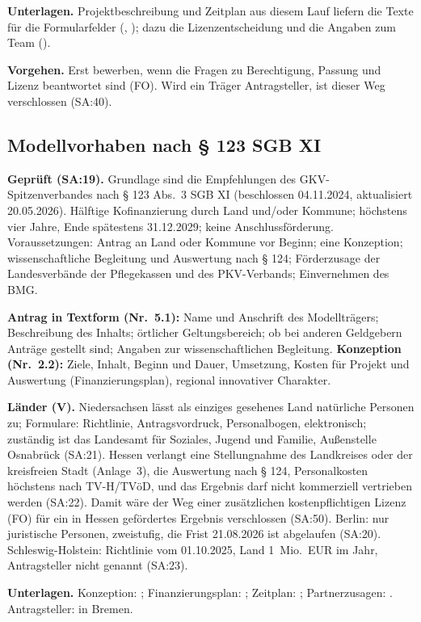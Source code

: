 \documentclass[10pt,parskip=half-]{scrartcl}
\begin{document}
\textbf{Unterlagen.} Projektbeschreibung und Zeitplan aus diesem Lauf liefern die Texte für die
Formularfelder (, ); dazu
die Lizenzentscheidung und die Angaben zum Team ().

\textbf{Vorgehen.} Erst bewerben, wenn die Fragen zu Berechtigung, Passung und Lizenz beantwortet
sind (FO). Wird ein Träger Antragsteller, ist dieser Weg verschlossen (SA:40).

\subsection{Modellvorhaben nach § 123 SGB XI}
\textbf{Geprüft (SA:19).} Grundlage sind die Empfehlungen des GKV-Spitzenverbandes nach
§ 123 Abs.~3 SGB XI (beschlossen 04.11.2024, aktualisiert 20.05.2026). Hälftige
Kofinanzierung durch Land und/oder Kommune; höchstens vier Jahre, Ende spätestens 31.12.2029;
keine Anschlussförderung. Voraussetzungen: Antrag an Land oder Kommune vor Beginn; eine
Konzeption; wissenschaftliche Begleitung und Auswertung nach § 124; Förderzusage der
Landesverbände der Pflegekassen und des PKV-Verbands; Einvernehmen des BMG.

\textbf{Antrag in Textform (Nr.~5.1):} Name und Anschrift des Modellträgers; Beschreibung des
Inhalts; örtlicher Geltungsbereich; ob bei anderen Geldgebern Anträge gestellt sind; Angaben zur
wissenschaftlichen Begleitung. \textbf{Konzeption (Nr.~2.2):} Ziele, Inhalt, Beginn und Dauer,
Umsetzung, Kosten für Projekt und Auswertung (Finanzierungsplan), regional innovativer Charakter.

\textbf{Länder (V).} Niedersachsen lässt als einziges gesehenes Land natürliche Personen zu;
Formulare: Richtlinie, Antragsvordruck, Personalbogen, elektronisch; zuständig ist das
Landesamt für Soziales, Jugend und Familie, Außenstelle Osnabrück (SA:21). Hessen verlangt eine
Stellungnahme des Landkreises oder der kreisfreien Stadt (Anlage~3), die Auswertung nach § 124,
Personalkosten höchstens nach TV-H/TVöD, und das Ergebnis darf nicht kommerziell vertrieben
werden (SA:22). Damit wäre der Weg einer zusätzlichen kostenpflichtigen Lizenz (FO) für ein in
Hessen gefördertes Ergebnis verschlossen (SA:50). Berlin: nur juristische Personen,
zweistufig, die Frist 21.08.2026 ist abgelaufen (SA:20). Schleswig-Holstein: Richtlinie vom
01.10.2025, Land 1~Mio.~EUR im Jahr, Antragsteller nicht genannt (SA:23).

\textbf{Unterlagen.} Konzeption: ; Finanzierungsplan:
; Zeitplan: ; Partnerzusagen:
. Antragsteller:  in
Bremen.
\end{document}

